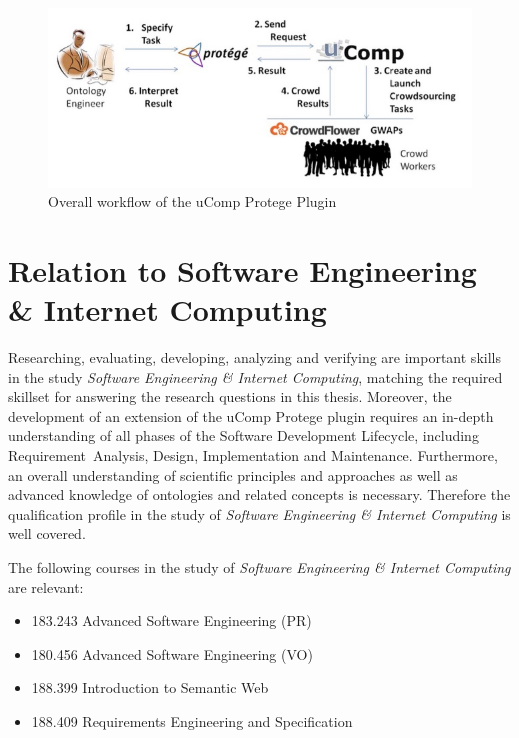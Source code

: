 \documentclass[12pt, notitlepage]{article}
\begin{document}
\begin{figure}[H]
	 \includegraphics[width=\textwidth]{graphics/ucomp_workflow}
	 \caption{Overall workflow of the uComp Protege Plugin~\cite{wohlgenannt2016crowd}}\label{fig:ucomp_workflow}
\end{figure}

\section{Relation to Software Engineering \& Internet Computing}
Researching, evaluating, developing, analyzing and verifying are important skills in the study \emph{Software Engineering \& Internet Computing}, matching the required skillset for answering the research questions in this thesis. Moreover, the development of an extension of the uComp Protege plugin requires an in-depth understanding of all phases of the Software Development Lifecycle, including Requirement~Analysis, Design, Implementation and Maintenance. Furthermore, an overall understanding of scientific principles and approaches as well as advanced knowledge of ontologies and related concepts is necessary. Therefore the qualification profile in the study of \emph{Software Engineering \& Internet Computing} is well covered. 

The following courses in the study of \emph{Software Engineering \& Internet Computing} are relevant:
\begin{itemize}
	\item 183.243 Advanced Software Engineering (PR)
	\item 180.456 Advanced Software Engineering (VO)
	\item 188.399 Introduction to Semantic Web
	\item 188.409 Requirements Engineering and Specification
\end{itemize}

\newpage


\end{document}
